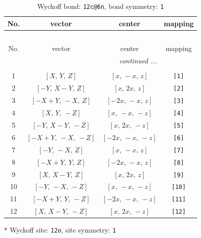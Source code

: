\documentclass[fleqn,8pt]{jsarticle}
\begin{document}
\begin{longtable}{cccc}
\caption{Wyckoff bond: {\tt 12c@6n}, bond symmetry: {\tt 1}}
 \\
 \hline \hline
No. & vector & center & mapping \\ \hline \endfirsthead

\multicolumn{3}{l}{\tablename\ \thetable{}} \\
 \hline \hline
No. & vector & center & mapping \\ \hline \endhead

 \hline \hline
\multicolumn{3}{r}{\footnotesize\it continued ...} \\ \endfoot

 \hline \hline
\multicolumn{3}{r}{} \\ \endlastfoot

1 & $\left[ X,\, Y,\, Z \right]$ & $\left[ x,\, - x,\, z \right]$ & {\tt [1]} \\ \hline
2 & $\left[ - Y,\, X - Y,\, Z \right]$ & $\left[ x,\, 2 x,\, z \right]$ & {\tt [2]} \\ \hline
3 & $\left[ - X + Y,\, - X,\, Z \right]$ & $\left[ - 2 x,\, - x,\, z \right]$ & {\tt [3]} \\ \hline
4 & $\left[ X,\, Y,\, - Z \right]$ & $\left[ x,\, - x,\, - z \right]$ & {\tt [4]} \\ \hline
5 & $\left[ - Y,\, X - Y,\, - Z \right]$ & $\left[ x,\, 2 x,\, - z \right]$ & {\tt [5]} \\ \hline
6 & $\left[ - X + Y,\, - X,\, - Z \right]$ & $\left[ - 2 x,\, - x,\, - z \right]$ & {\tt [6]} \\ \hline
7 & $\left[ - Y,\, - X,\, Z \right]$ & $\left[ x,\, - x,\, z \right]$ & {\tt [7]} \\ \hline
8 & $\left[ - X + Y,\, Y,\, Z \right]$ & $\left[ - 2 x,\, - x,\, z \right]$ & {\tt [8]} \\ \hline
9 & $\left[ X,\, X - Y,\, Z \right]$ & $\left[ x,\, 2 x,\, z \right]$ & {\tt [9]} \\ \hline
10 & $\left[ - Y,\, - X,\, - Z \right]$ & $\left[ x,\, - x,\, - z \right]$ & {\tt [10]} \\ \hline
11 & $\left[ - X + Y,\, Y,\, - Z \right]$ & $\left[ - 2 x,\, - x,\, - z \right]$ & {\tt [11]} \\ \hline
12 & $\left[ X,\, X - Y,\, - Z \right]$ & $\left[ x,\, 2 x,\, - z \right]$ & {\tt [12]} \\
\end{longtable}
* Wyckoff site: {\tt 12o}, site symmetry: {\tt 1}
\renewcommand{\arraystretch}{1.2}
\end{document}
